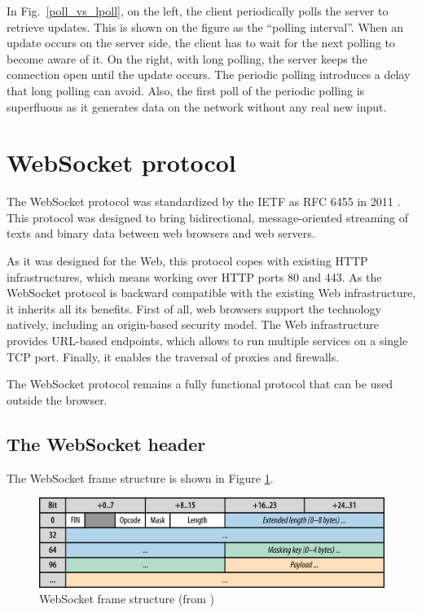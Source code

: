 \documentclass[10pt,journal,compsoc]{IEEEtran}
\newcommand{\ws}{WebSocket}
\begin{document}
In Fig.~\ref{poll_vs_lpoll}, on the left, the client periodically polls the server to retrieve updates. This is shown on the figure as the ``polling interval''. When an update occurs on the server side, the client has to wait for the next polling to become aware of it. On the right, with long polling, the server keeps the connection open until the update occurs. The periodic polling introduces a delay that long polling can avoid. Also, the first poll of the periodic polling is superfluous as it generates data on the network without any real new input. %

\section{\ws{} protocol}
\label{sec:ws}
The \ws{} protocol was standardized by the IETF as RFC 6455 in 2011 \cite{rfc6455}.
This protocol was designed to bring bidirectional, message-oriented streaming of texts and binary data between web browsers and web servers.

As it was designed for the Web, this protocol copes with existing HTTP infrastructures, which means working over HTTP ports 80 and 443.%
As the \ws{} protocol is backward compatible with the existing Web infrastructure, it inherits all its benefits. %
First of all, web browsers support the technology natively, including an origin-based security model. %
The Web infrastructure provides URL-based endpoints, which allows to run multiple services on a single TCP port.
Finally, it enables the traversal of proxies and firewalls.

The \ws{} protocol remains a fully functional protocol that can be used outside the browser.

\subsection{The \ws{} header}
\label{sec:ws-header}
The \ws{} frame structure is shown in Figure \ref{fig:websocket_frame}.

\begin{figure}
    \centering
    \includegraphics[width=\linewidth]{websocket_frame.png}
    \caption{\ws{} frame structure (from \cite{HighPerfBrowserNetworking:websocket})}
    \label{fig:websocket_frame}
\end{figure}
\end{document}
